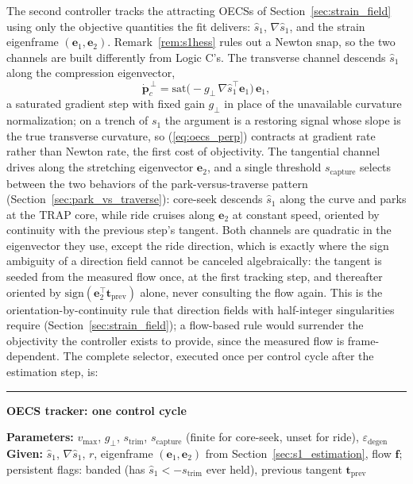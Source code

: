 \documentclass[lettersize,journal]{IEEEtran}
\begin{document}
The second controller tracks the attracting OECSs of
Section~\ref{sec:strain_field} using only the objective quantities the
fit delivers: $\hat{s}_1$, $\nabla\hat{s}_1$, and the strain eigenframe
$(\mathbf{e}_1, \mathbf{e}_2)$. Remark~\ref{rem:s1hess} rules out a
Newton snap, so the two channels are built differently from Logic C's.
The transverse channel descends $\hat{s}_1$ along the compression
eigenvector,
\begin{equation}
    \dot{\mathbf{p}}_c^{\,\perp} =
    \mathrm{sat}\!\bigl(-g_\perp\,\nabla\hat{s}_1^\top
    \mathbf{e}_1\bigr)\,\mathbf{e}_1,
    \label{eq:oecs_perp}
\end{equation}
a saturated gradient step with fixed gain $g_\perp$ in place of the
unavailable curvature normalization; on a trench of $s_1$ the argument
is a restoring signal whose slope is the true transverse curvature, so
(\ref{eq:oecs_perp}) contracts at gradient rate rather than Newton
rate, the first cost of objectivity. The tangential channel drives
along the stretching eigenvector $\mathbf{e}_2$, and a single threshold
$s_{\text{capture}}$ selects between the two behaviors of the
park-versus-traverse pattern (Section~\ref{sec:park_vs_traverse}):
core-seek descends $\hat{s}_1$ along the curve and parks at the TRAP
core, while ride cruises along $\mathbf{e}_2$ at constant speed,
oriented by continuity with the previous step's tangent.
Both channels are quadratic in the eigenvector they use, except the
ride direction, which is exactly where the sign ambiguity of a
direction field cannot be canceled algebraically: the tangent is
seeded from the measured flow once, at the first tracking step, and
thereafter oriented by $\mathrm{sign}(\mathbf{e}_2^\top
\mathbf{t}_{\text{prev}})$ alone, never consulting the flow again. This
is the orientation-by-continuity rule that direction fields with
half-integer singularities require
(Section~\ref{sec:strain_field}); a flow-based rule would surrender
the objectivity the controller exists to provide, since the measured
flow is frame-dependent. The complete selector, executed once per
control cycle after the estimation step, is:

\vspace{4pt}
\hrule
\vspace{4pt}
\noindent\textbf{OECS tracker: one control cycle}

\vspace{3pt}
\noindent\textbf{Parameters:} $v_{\max}$, $g_\perp$,
$s_{\text{trim}}$, $s_{\text{capture}}$ (finite for core-seek, unset
for ride), $\varepsilon_{\text{degen}}$\\
\textbf{Given:} $\hat{s}_1$, $\nabla\hat{s}_1$, $r$, eigenframe
$(\mathbf{e}_1, \mathbf{e}_2)$ from Section~\ref{sec:s1_estimation},
flow $\mathbf{f}$; persistent flags: banded (has $\hat{s}_1 <
-s_{\text{trim}}$ ever held), previous tangent
$\mathbf{t}_{\text{prev}}$
\end{document}
